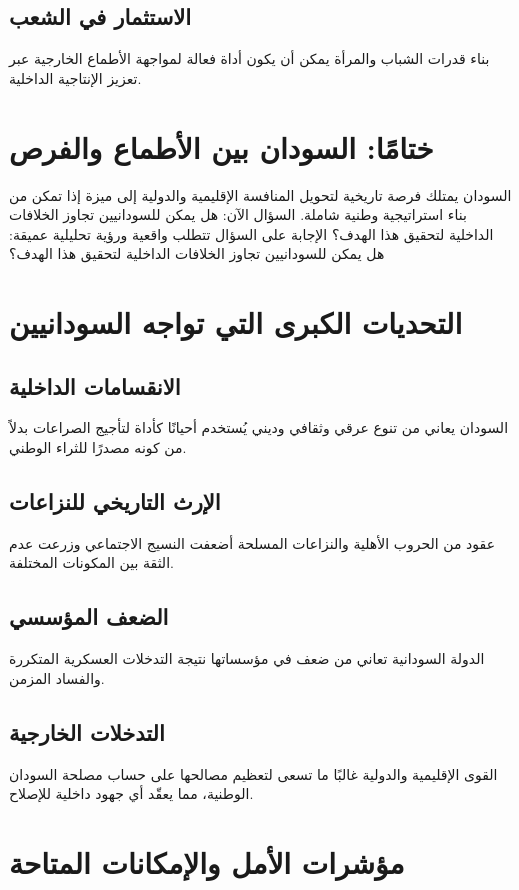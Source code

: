 \documentclass[12pt]{article}
\begin{document}
\subsection{الاستثمار في الشعب}
بناء قدرات الشباب والمرأة يمكن أن يكون أداة فعالة لمواجهة الأطماع الخارجية عبر تعزيز الإنتاجية الداخلية.

\section{ختامًا: السودان بين الأطماع والفرص}
السودان يمتلك فرصة تاريخية لتحويل المنافسة الإقليمية والدولية إلى ميزة إذا تمكن من بناء استراتيجية وطنية شاملة. السؤال الآن: هل يمكن للسودانيين تجاوز الخلافات الداخلية لتحقيق هذا الهدف؟ الإجابة على السؤال تتطلب واقعية ورؤية تحليلية عميقة: هل يمكن للسودانيين تجاوز الخلافات الداخلية لتحقيق هذا الهدف؟

\section{التحديات الكبرى التي تواجه السودانيين}
\subsection{الانقسامات الداخلية}
السودان يعاني من تنوع عرقي وثقافي وديني يُستخدم أحيانًا كأداة لتأجيج الصراعات بدلاً من كونه مصدرًا للثراء الوطني.

\subsection{الإرث التاريخي للنزاعات}
عقود من الحروب الأهلية والنزاعات المسلحة أضعفت النسيج الاجتماعي وزرعت عدم الثقة بين المكونات المختلفة.

\subsection{الضعف المؤسسي}
الدولة السودانية تعاني من ضعف في مؤسساتها نتيجة التدخلات العسكرية المتكررة والفساد المزمن.

\subsection{التدخلات الخارجية}
القوى الإقليمية والدولية غالبًا ما تسعى لتعظيم مصالحها على حساب مصلحة السودان الوطنية، مما يعقّد أي جهود داخلية للإصلاح.

\section{مؤشرات الأمل والإمكانات المتاحة}
\end{document}
